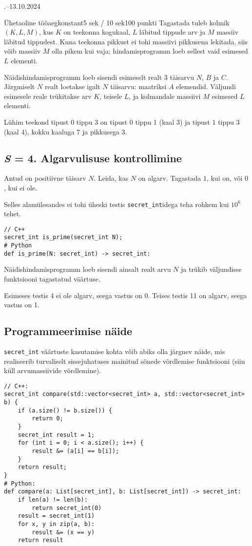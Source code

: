 \documentclass[a4paper,11pt]{article}
\begin{document}
\begin{ol}{\eio}{.--13.10.2024}{\yle}{}
\begin{yl}{7}{Ühetaoline tööaeg}{konstant}{5 sek / 10 sek}{100 punkti}
	Tagastada tuleb kolmik $(K, L, M)$, kus $K$ on teekonna kogukaal, $L$ läbitud tippude arv ja $M$ massiiv läbitud tippudest.
	Kuna teekonna pikkust ei tohi massiivi pikkusena lekitada, siis võib massiiv $M$ olla pikem kui vaja; hindamisprogramm loeb sellest vaid esimesed $L$ elementi.

	Näidishindamisprogramm loeb sisendi esimeselt realt 3 täisarvu $N$, $B$ ja $C$. Järgmiselt $N$ realt loetakse igalt $N$ täisarvu: maatriksi $A$ elemendid. Väljundi esimesele reale trükitakse arv $K$, teisele $L$, ja kolmandale massiivi $M$ esimesed $L$ elementi.

	\nde[3]{4cm}{4cm}
	Lühim teekond tipust 0 tippu 3 on tipust 0 tippu 1 (kaal 3) ja tipust 1 tippu 3 (kaal 4), kokku kaaluga 7 ja pikkusega 3.

	\subsection*{\emph{S} = 4. Algarvulisuse kontrollimine}

	Antud on positiivne täisarv $N$. Leida, kas $N$ on algarv. Tagastada $1$, kui on, või $0$, kui ei ole.

	Selles alamülesandes ei tohi üheski testis \verb'secret_int'idega teha rohkem kui $10^6$ tehet.

\begin{verbatim}
// C++
secret_int is_prime(secret_int N);
# Python
def is_prime(N: secret_int) -> secret_int:
\end{verbatim}

	Näidishindamisprogramm loeb sisendi ainsalt realt arvu $N$ ja trükib väljundisse funktsiooni tagastatud väärtuse.

	\nde[4]{4cm}{4cm}
	Esimeses testis 4 ei ole algarv, seega vastus on 0. Teises testis 11 on algarv, seega vastus on 1.

	\subsection*{Programmeerimise näide}

	\verb'secret_int' väärtuste kasutamise kohta võib abiks olla järgnev näide, mis realiseerib turvaliselt sissejuhatuses mainitud sõnede võrdlemise funktsiooni (siin küll arvumassiivide võrdlemine).

	\clearpage
\begin{verbatim}
// C++:
secret_int compare(std::vector<secret_int> a, std::vector<secret_int> b) {
    if (a.size() != b.size()) {
        return 0;
    }
    secret_int result = 1;
    for (int i = 0; i < a.size(); i++) {
        result &= (a[i] == b[i]);
    }
    return result;
}
# Python:
def compare(a: List[secret_int], b: List[secret_int]) -> secret_int:
    if len(a) != len(b):
        return secret_int(0)
    result = secret_int(1)
    for x, y in zip(a, b):
        result &= (x == y)
    return result
\end{verbatim}


\end{yl}
\end{ol}
\end{document}

